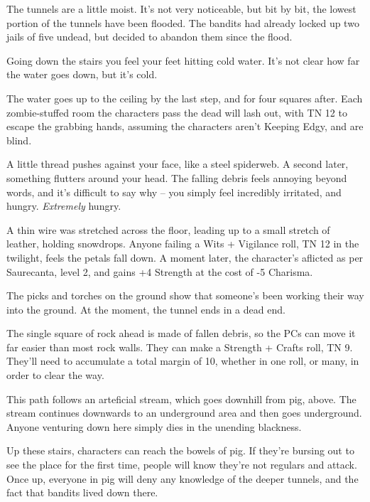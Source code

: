  

The tunnels are a little moist.  It's not very noticeable, but bit by bit, the lowest portion of the tunnels have been flooded.  The bandits had already locked up two jails of five undead, but decided to abandon them since the flood.


\begin{boxtext}
	Going down the stairs you feel your feet hitting cold water.  It's not clear how far the water goes down, but it's cold.
\end{boxtext}

The water goes up to the ceiling by the last step, and for four squares after.  Each zombie-stuffed room the characters pass the dead will lash out, with TN 12 to escape the grabbing hands, assuming the characters aren't Keeping Edgy, and are blind.


\begin{boxtext}
	A little thread pushes against your face, like a steel spiderweb.  A second later, something flutters around your head.  The falling debris feels annoying beyond words, and it's difficult to say why -- you simply feel incredibly irritated, and hungry.  \emph{Extremely} hungry.
\end{boxtext}

A thin wire was stretched across the floor, leading up to a small stretch of leather, holding snowdrops.  Anyone failing a Wits + Vigilance roll, TN 12 in the twilight, feels the petals fall down.  A moment later, the character's aflicted as per Saurecanta, level 2, and gains +4 Strength at the cost of -5 Charisma.


\begin{boxtext}
	The picks and torches on the ground show that someone's been working their way into the ground.  At the moment, the tunnel ends in a dead end.
\end{boxtext}
 
The single square of rock ahead is made of fallen debris, so the PCs can move it far easier than most rock walls.  They can make a Strength + Crafts roll, TN 9.  They'll need to accumulate a total margin of 10, whether in one roll, or many, in order to clear the way.

\label{pigexit}

\label{slidein}

This path follows an arteficial stream, which goes downhill from \gls{pig}, above.  The stream continues downwards to an underground area and then goes underground.  Anyone venturing down here simply dies in the unending blackness.



Up these stairs, characters can reach the bowels of \gls{pig}.  If they're bursing out to see the place for the first time, people will know they're not regulars and attack.  Once up, everyone in \gls{pig} will deny any knowledge of the deeper tunnels, and the fact that bandits lived down there.

